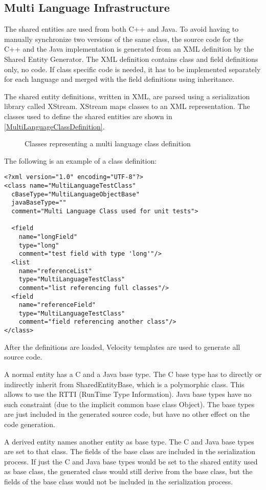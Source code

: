 \documentclass[a4paper,12pt]{article}
\newlength{\imgwidth}
\newcommand{\umlDiagram}[1]{%
	\settowidth{\imgwidth}{\texttt{[image: out/diagrams/\#1.pdf]}}%
	\setlength{\imgwidth}{\minof{0.5\imgwidth}{\textwidth}}%
	\par\vskip0.5cm\noindent\makebox[\textwidth][c]{%
	\texttt{[image: out/diagrams/\#1.pdf]}%
}\vskip0.5cm}
\newcommand{\umlFloat}[2]{
\begin{figure}[htbp]
\umlDiagram{#1}
\caption{#2}
\label{#1}
\end{figure}
}
\newcommand{\umlRef}[1]{\autoref{#1}}
\begin{document}
\subsection{Multi Language Infrastructure}
\label{sec:MultiLanguageInfrastructure}
The shared entities are used from both C++ and Java. To avoid having to
manually synchronize two versions of the same class, the source code for the C++
and the Java implementation is generated from an XML definition by the Shared
Entity Generator. The XML definition contains class and field definitions only,
no code. If class specific code is needed, it has to be implemented separately for each language and merged with the field definitions using
inheritance.

The shared entity definitions, written in XML, are parsed using a
serialization library called XStream. XStream maps classes to an XML
representation. The classes used to define the shared entities are shown
in \umlRef{MultiLanguageClassDefinition}.

\umlFloat{MultiLanguageClassDefinition}{Classes representing a multi language
class definition}

The following is an example of a class definition:
\begin{verbatim}
<?xml version="1.0" encoding="UTF-8"?>
<class name="MultiLanguageTestClass" 
  cBaseType="MultiLanguageObjectBase"
  javaBaseType=""
  comment="Multi Language Class used for unit tests">

  <field 
    name="longField" 
    type="long" 
    comment="test field with type 'long'"/>
  <list  
    name="referenceList" 
    type="MultiLanguageTestClass" 
    comment="list referencing full classes"/>
  <field 
    name="referenceField" 
    type="MultiLanguageTestClass" 
    comment="field referencing another class"/>
</class>
\end{verbatim}

After the definitions are loaded, Velocity templates are used to generate all
source code.

A normal entity has a C and a Java base type. The C base type has to directly or
indirectly inherit from SharedEntityBase, which is a polymorphic class.
This allows to use the RTTI (RunTime Type Information). Java base types have no
such constraint (due to the implicit common base class Object). The base types
are just included in the generated source code, but have no other effect on the
code generation.

A derived entity names another entity as base type. The C and
Java base types are set to that class. The fields of the base class are included in
the serialization process. If just the C and Java base types would be set to the
shared entity used as base class, the generated class would still derive
from the base class, but the fields of the base class would not be included in
the serialization process.
\end{document}
